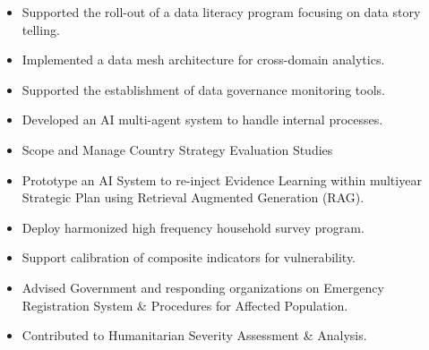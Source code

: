 \documentclass[10pt,a4paper,ragged2e,withhyper]{altacv}
\begin{document}
\begin{paracol}{2}

\begin{itemize}
\item Supported the roll-out of a data literacy program focusing on data story telling.
\item Implemented a data mesh architecture for cross-domain analytics.  
\item Supported the establishment of data governance monitoring tools.  
\item Developed an AI multi-agent system to handle internal processes.

\end{itemize}

\divider

\begin{itemize}
\item Scope and Manage Country Strategy Evaluation Studies
\item Prototype an AI System to re-inject Evidence Learning within multiyear Strategic Plan using Retrieval Augmented Generation (RAG).

\end{itemize}

\divider

\begin{itemize}
\item Deploy harmonized high frequency household survey program.  
\item Support calibration of composite indicators for vulnerability.

\end{itemize}

\divider

\begin{itemize}
\item Advised Government and responding organizations on Emergency Registration System \& Procedures for Affected Population.  
\item Contributed to Humanitarian Severity Assessment \& Analysis.


\end{itemize}
\end{paracol}
\end{document}

